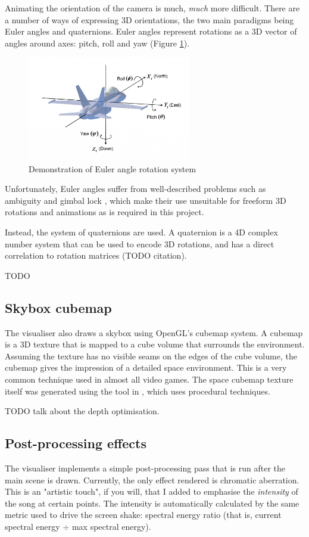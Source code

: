 \documentclass[11pt]{article}
\begin{document}
Animating the orientation of the camera is much, \textit{much} more difficult. There are a number of ways of
expressing 3D orientations, the two main paradigms being Euler angles and quaternions. Euler angles represent
rotations as a 3D vector of angles around axes: pitch, roll and yaw (Figure \ref{fig:euler}).

\begin{figure}[H]
\centering
\includegraphics[width=270px]{img/euler.png}
\caption{Demonstration of Euler angle rotation system}
\label{fig:euler}
\end{figure}

Unfortunately, Euler angles suffer from well-described problems such as ambiguity and gimbal lock
\cite{Hemingway2018}, which make their use unsuitable for freeform 3D rotations and animations as is required
in this project.

Instead, the system of quaternions are used. A quaternion is a 4D complex number system that can be used to
encode 3D rotations, and has a direct correlation to rotation matrices (TODO citation).

TODO

\subsection{Skybox cubemap}
The visualiser also draws a skybox using OpenGL's cubemap system. A cubemap is a 3D texture that is mapped to
a cube volume that surrounds the environment. Assuming the texture has no visible seams on the edges of the
cube volume, the cubemap gives the impression of a detailed space environment. This is a very common technique
used in almost all video games. The space cubemap texture itself was generated using the tool in
\cite{tyroSpace}, which uses procedural techniques.

TODO talk about the depth optimisation.

\subsection{Post-processing effects}
The visualiser implements a simple post-processing pass that is run after the main scene is drawn. Currently,
the only effect rendered is chromatic aberration. This is an "artistic touch", if you will, that I added to
emphasise the \textit{intensity} of the song at certain points. The intensity is automatically calculated by
the same metric used to drive the screen shake: spectral energy ratio (that is, current spectral energy $\div$
max spectral energy).
\end{document}
